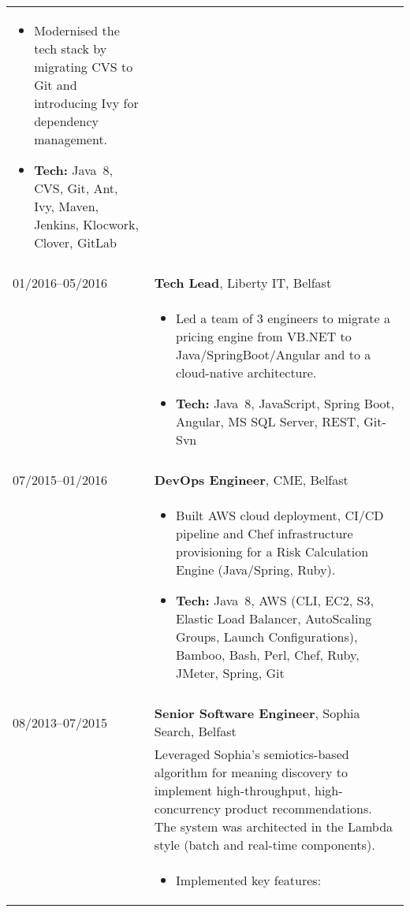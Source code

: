 \documentclass[2pt,a4paper]{article}
\newlength{\datecolumn}
\newlength{\textcolumn}
\begin{document}
\begin{longtable}{p{\datecolumn} p{\textcolumn}}
\begin{itemize}
                         \item Modernised the tech stack by migrating CVS to Git and introducing Ivy for dependency management.
                         \item \textbf{Tech:} Java~8, CVS, Git, Ant, Ivy, Maven, Jenkins, Klocwork, Clover, GitLab 
                   \end{itemize} \\ \\
01/2016--05/2016 & \textbf{Tech Lead}, Liberty IT, Belfast \\
                 & \begin{itemize}
                         \item Led a team of 3 engineers to migrate a pricing engine from VB.NET to Java/SpringBoot/Angular and to a cloud-native architecture.
                         \item \textbf{Tech:} Java~8, JavaScript, Spring Boot, Angular, MS SQL Server, REST, Git-Svn
                   \end{itemize} \\ \\
07/2015--01/2016 & \textbf{DevOps Engineer}, CME, Belfast \\
                 & \begin{itemize}
                         \item Built AWS cloud deployment, CI/CD pipeline and Chef infrastructure provisioning for a Risk Calculation Engine (Java/Spring, Ruby).
                         \item \textbf{Tech:} Java~8, AWS (CLI, EC2, S3, Elastic Load Balancer, AutoScaling Groups, Launch Configurations), Bamboo, Bash, Perl, Chef, Ruby, JMeter, Spring, Git 
                   \end{itemize} \\ \\
08/2013--07/2015 & \textbf{Senior Software Engineer}, Sophia Search, Belfast \\
                 & Leveraged Sophia’s semiotics-based algorithm for meaning discovery to implement high-throughput, high-concurrency product recommendations. The system was architected in the Lambda style (batch and real-time components). \\
                 & \begin{itemize}
                         \item Implemented key features:
                         \begin{itemize}

\end{itemize}
\end{itemize}
\end{longtable}
\end{document}

